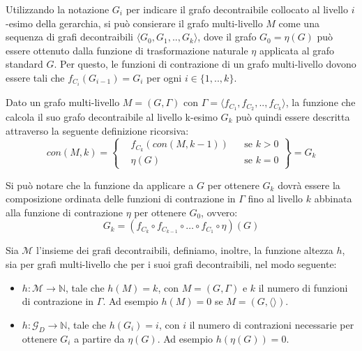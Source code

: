 Utilizzando la notazione $G_i$ per indicare il grafo decontraibile collocato al livello $i$-esimo della gerarchia,
si pu\`o consierare il grafo multi-livello $M$ come una sequenza di grafi decontraibili
$\langle G_0, G_1, .., G_k \rangle$, dove il grafo $G_0 = \eta(G)$ pu\`o essere ottenuto dalla funzione di
trasformazione naturale $\eta$ applicata al grafo standard $G$.
Per questo, le funzioni di contrazione di un grafo multi-livello dovono essere tali che
$f_{C_i}(G_{i-1}) = G_i$ per ogni $i \in \{1, .., k\}$. \newline

Dato un grafo multi-livello $M = (G,\Gamma)$ con $\Gamma = \langle f_{C_1}, f_{C_2}, .., f_{C_k} \rangle$,
la funzione che calcola il suo grafo decontraibile al livello k-esimo $G_k$ pu\`o quindi essere descritta
attraverso la seguente definizione ricorsiva: \newline
\begin{equation*}
    con(M, k) =
    \left\{
    \begin{aligned}
        &f_{C_k}(con(M, k-1)) && \text{se } k > 0\\
        &\eta(G)  && \text{se } k = 0
    \end{aligned}
    \right\}
    = G_k
\end{equation*} \newline

Si pu\`o notare che la funzione da applicare a $G$ per ottenere $G_{k}$ dovr\`a essere la composizione ordinata
delle funzioni di contrazione in $\Gamma$ fino al livello $k$ abbinata alla funzione di contrazione $\eta$ per
ottenere $G_0$, ovvero:
\begin{equation*}
    G_k = (f_{C_k} \circ f_{C_{k-1}} \circ \ldots \circ f_{C_1} \circ \eta)(G)
\end{equation*}

Sia $\mathcal{M}$ l'insieme dei grafi decontraibili, definiamo, inoltre, la funzione altezza $h$, sia
per grafi multi-livello che per i suoi grafi decontraibili, nel modo seguente:

\begin{itemize}
    \item $h : \mathcal{M} \rightarrow \mathbb{N}$, tale che $h(M) = k$, con $M = (G, \Gamma)$ e $k$ il numero di
    funzioni di contrazione in $\Gamma$. Ad esempio $h(M) = 0$ se $M = (G, \langle \rangle)$.
    \item $h : \mathcal{G}_D \rightarrow \mathbb{N}$, tale che $h(G_i) = i$, con $i$ il numero di contrazioni
    necessarie per ottenere $G_i$ a partire da $\eta(G)$. Ad esempio $h(\eta(G)) = 0$.
\end{itemize}

